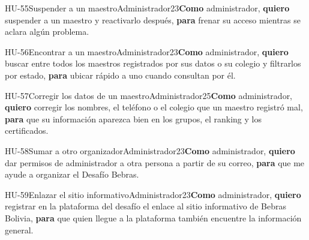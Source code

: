 \begin{historia}[1]{HU-55}{Suspender a un maestro}{Administrador}{2}{3}{\textbf{Como} administrador, \textbf{quiero} suspender a un maestro y reactivarlo después, \textbf{para} frenar su acceso mientras se aclara algún problema.}
\end{historia}

\begin{historia}[1]{HU-56}{Encontrar a un maestro}{Administrador}{2}{3}{\textbf{Como} administrador, \textbf{quiero} buscar entre todos los maestros registrados por sus datos o su colegio y filtrarlos por estado, \textbf{para} ubicar rápido a uno cuando consultan por él.}
\end{historia}

\begin{historia}[1]{HU-57}{Corregir los datos de un maestro}{Administrador}{2}{5}{\textbf{Como} administrador, \textbf{quiero} corregir los nombres, el teléfono o el colegio que un maestro registró mal, \textbf{para} que su información aparezca bien en los grupos, el ranking y los certificados.}
\end{historia}

\begin{historia}[1]{HU-58}{Sumar a otro organizador}{Administrador}{2}{3}{\textbf{Como} administrador, \textbf{quiero} dar permisos de administrador a otra persona a partir de su correo, \textbf{para} que me ayude a organizar el Desafío Bebras.}
\end{historia}

\begin{historia}[1]{HU-59}{Enlazar el sitio informativo}{Administrador}{2}{3}{\textbf{Como} administrador, \textbf{quiero} registrar en la plataforma del desafío el enlace al sitio informativo de Bebras Bolivia, \textbf{para} que quien llegue a la plataforma también encuentre la información general.}
\end{historia}


